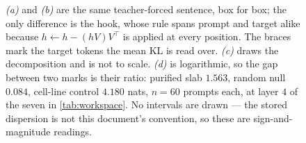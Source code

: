 \begin{figure}[htbp]
  \begin{fullwidth}
  \centering
  
  \caption[The causal measurement]{ \emph{(a)} and \emph{(b)}
are the same teacher-forced sentence, box for box; the only difference is the
hook, whose rule spans prompt and target alike because $h \leftarrow h -
(hV)V^{\top}$ is applied at every position. The braces mark the target tokens
the mean KL is read over. \emph{(c)} draws the decomposition and is not to
scale. \emph{(d)} is logarithmic, so the gap between two marks is their ratio:
purified slab $1.563$, random null $0.084$, cell-line control $4.180$ nats,
$n = 60$ prompts each, at layer $4$ of the seven in \cref{tab:workspace}. No
intervals are drawn --- the stored dispersion is not this document's
convention, so these are sign-and-magnitude readings.}
  \label{fig:hook}
  \end{fullwidth}
  \end{figure}
  

